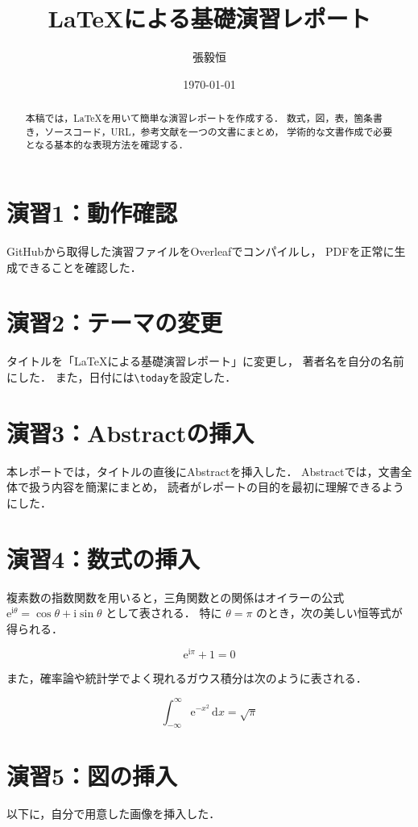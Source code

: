 ﻿\documentclass[a4paper,twocolumn]{jsarticle}
\title{%
LaTeXによる基礎演習レポート
}
\author{張毅恒}
\date{\today}
\newcommand{\dif}{\mathrm{d}}
\newcommand{\ee}{\mathrm{e}}
\newcommand{\ii}{\mathrm{i}}
\begin{document}
\maketitle

\begin{abstract}
本稿では，LaTeXを用いて簡単な演習レポートを作成する．
数式，図，表，箇条書き，ソースコード，URL，参考文献を一つの文書にまとめ，
学術的な文書作成で必要となる基本的な表現方法を確認する．
\end{abstract}

\section*{演習1：動作確認}
GitHubから取得した演習ファイルをOverleafでコンパイルし，
PDFを正常に生成できることを確認した．

\section*{演習2：テーマの変更}
タイトルを「LaTeXによる基礎演習レポート」に変更し，
著者名を自分の名前にした．
また，日付には\verb|\today|を設定した．

\section*{演習3：Abstractの挿入}
本レポートでは，タイトルの直後にAbstractを挿入した．
Abstractでは，文書全体で扱う内容を簡潔にまとめ，
読者がレポートの目的を最初に理解できるようにした．

\section*{演習4：数式の挿入}
複素数の指数関数を用いると，三角関数との関係はオイラーの公式
$\ee^{\ii\theta}=\cos\theta+\ii\sin\theta$ として表される．
特に $\theta=\pi$ のとき，次の美しい恒等式が得られる．

\begin{equation}
\ee^{\ii\pi}+1=0
\label{eq:euler_identity}
\end{equation}

また，確率論や統計学でよく現れるガウス積分は次のように表される．

\begin{equation}
\int_{-\infty}^{\infty}\ee^{-x^2}\,\dif x=\sqrt{\pi}
\label{eq:gaussian_integral}
\end{equation}

\section*{演習5：図の挿入}
以下に，自分で用意した画像を挿入した．
\end{document}
